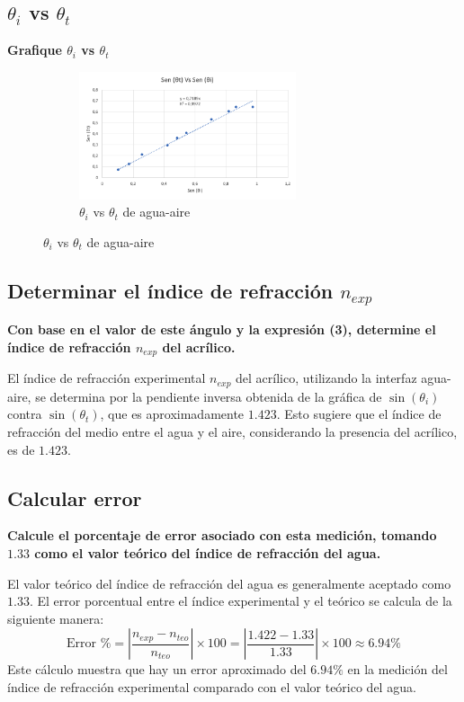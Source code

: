 \subsection{$\theta_{i}$ vs $\theta_{t}$}
\textbf{Grafique $\theta_{i}$ vs $\theta_{t}$}

\begin{figure}[H]
  \centering
  \begin{subfigure}[b]{\textwidth}
      \centering
      \includegraphics[width=0.7\textwidth]{Figures/1. Content/grafica2.png}
      \caption{$\theta_{i}$ vs $\theta_{t}$ de agua-aire}
      \label{fig: Grafica 2}
  \end{subfigure}
  \hfill
\end{figure}

\subsection{Determinar el índice de refracción $n_{exp}$}
\textbf{Con base en el valor de este ángulo y la expresión (3), determine el índice de
refracción $n_{exp}$ del acrílico.}

El índice de refracción experimental $n_{exp}$ del acrílico, utilizando la interfaz agua-aire, se determina por la pendiente inversa obtenida de la gráfica de $\sin(\theta_i)$ contra $\sin(\theta_t)$, que es aproximadamente $1.423$. Esto sugiere que el índice de refracción del medio entre el agua y el aire, considerando la presencia del acrílico, es de $1.423$.

\subsection{Calcular error}
\textbf{Calcule el porcentaje de error asociado con esta medición, tomando $1.33$ como el
valor teórico del índice de refracción del agua.}

El valor teórico del índice de refracción del agua es generalmente aceptado como $1.33$. El error porcentual entre el índice experimental y el teórico se calcula de la siguiente manera:
\[
\text{Error \%} = \left| \frac{n_{exp} - n_{teo}}{n_{teo}} \right| \times 100 = \left| \frac{1.422 - 1.33}{1.33} \right| \times 100 \approx 6.94\%
\]
Este cálculo muestra que hay un error aproximado del $6.94\%$ en la medición del índice de refracción experimental comparado con el valor teórico del agua.

